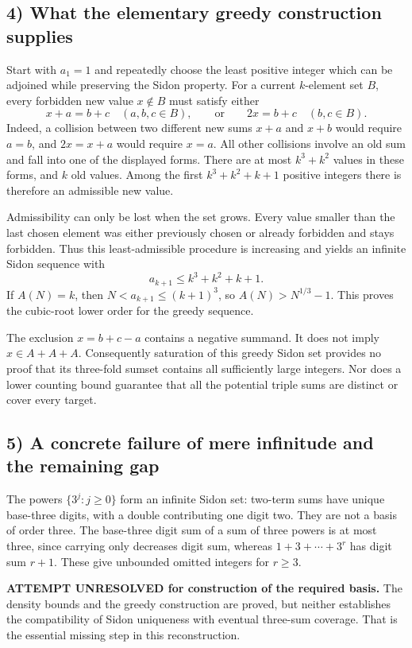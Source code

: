 \subsection*{4) What the elementary greedy construction supplies}
Start with $a_1=1$ and repeatedly choose the least positive integer which can be adjoined while preserving the Sidon property. For a current $k$-element set $B$, every forbidden new value $x\notin B$ must satisfy either
\[
 x+a=b+c\quad(a,b,c\in B),\qquad\text{or}\qquad 2x=b+c\quad(b,c\in B).
\]
Indeed, a collision between two different new sums $x+a$ and $x+b$ would require $a=b$, and $2x=x+a$ would require $x=a$. All other collisions involve an old sum and fall into one of the displayed forms. There are at most $k^3+k^2$ values in these forms, and $k$ old values. Among the first $k^3+k^2+k+1$ positive integers there is therefore an admissible new value.

Admissibility can only be lost when the set grows. Every value smaller than the last chosen element was either previously chosen or already forbidden and stays forbidden. Thus this least-admissible procedure is increasing and yields an infinite Sidon sequence with
\[
 a_{k+1}\le k^3+k^2+k+1.
\]
If $A(N)=k$, then $N<a_{k+1}\le(k+1)^3$, so $A(N)>N^{1/3}-1$. This proves the cubic-root lower order for the greedy sequence.

The exclusion $x=b+c-a$ contains a negative summand. It does not imply $x\in A+A+A$. Consequently saturation of this greedy Sidon set provides no proof that its three-fold sumset contains all sufficiently large integers. Nor does a lower counting bound guarantee that all the potential triple sums are distinct or cover every target.

\subsection*{5) A concrete failure of mere infinitude and the remaining gap}
The powers $\{3^j:j\ge0\}$ form an infinite Sidon set: two-term sums have unique base-three digits, with a double contributing one digit two. They are not a basis of order three. The base-three digit sum of a sum of three powers is at most three, since carrying only decreases digit sum, whereas $1+3+\cdots+3^r$ has digit sum $r+1$. These give unbounded omitted integers for $r\ge3$.

\textbf{ATTEMPT UNRESOLVED for construction of the required basis.} The density bounds and the greedy construction are proved, but neither establishes the compatibility of Sidon uniqueness with eventual three-sum coverage. That is the essential missing step in this reconstruction.

